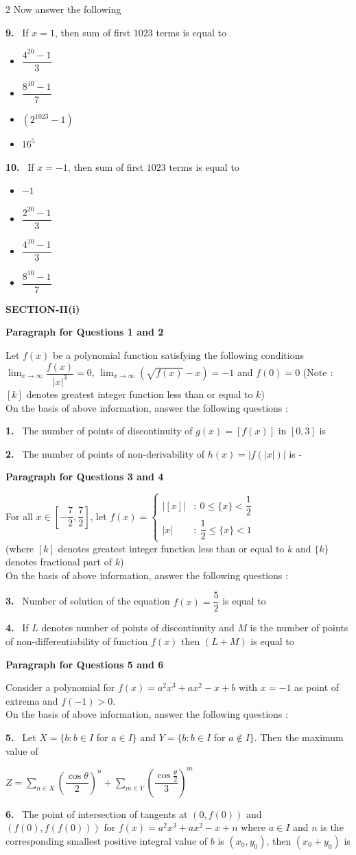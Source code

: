 \documentclass[10pt]{extarticle}
\newcommand{\sect}[1]{\par\smallskip\noindent\textbf{#1}\par}
\newcommand{\qn}[1]{\par\smallskip\noindent\textbf{#1.}~}
\newcommand{\paraq}[2]{\par\smallskip\noindent\textbf{Paragraph for Questions #1 and #2}\par}
\newenvironment{qoptions}{\begin{itemize}[leftmargin=1.8em,itemsep=1pt,topsep=2pt,label={}]}{\end{itemize}}
\newcommand{\opt}[2]{\item[(#1)] #2}
\begin{document}
\begin{multicols}{2}
Now answer the following
\qn{9} If $x=1$, then sum of first $1023$ terms is equal to
\begin{qoptions}
\opt{A}{$\dfrac{4^{20}-1}{3}$}
\opt{B}{$\dfrac{8^{10}-1}{7}$}
\opt{C}{$(2^{1023}-1)$}
\opt{D}{$16^5$}
\end{qoptions}
\qn{10} If $x=-1$, then sum of first $1023$ terms is equal to
\begin{qoptions}
\opt{A}{$-1$}
\opt{B}{$\dfrac{2^{20}-1}{3}$}
\opt{C}{$\dfrac{4^{10}-1}{3}$}
\opt{D}{$\dfrac{8^{10}-1}{7}$}
\end{qoptions}
\sect{SECTION-II(i)}
\paraq{1}{2}
Let $f(x)$ be a polynomial function satisfying the following conditions $\displaystyle\lim_{x\to\infty}\dfrac{f(x)}{|x|^3}=0$, $\displaystyle\lim_{x\to\infty}\left(\sqrt{f(x)}-x\right)=-1$ and $f(0)=0$ (Note : $[k]$ denotes greatest integer function less than or equal to $k$)\\
On the basis of above information, answer the following questions :
\qn{1} The number of points of discontinuity of $g(x)=[f(x)]$ in $[0,3]$ is
\qn{2} The number of points of non-derivability of $h(x)=|f(|x|)|$ is -
\paraq{3}{4}
For all $x\in\left[-\dfrac72,\dfrac72\right]$, let $f(x)=\begin{cases}\bigl|[x]\bigr| & ;\ 0\le\{x\}<\dfrac12\\ |x| & ;\ \dfrac12\le\{x\}<1\end{cases}$\\
(where $[k]$ denotes greatest integer function less than or equal to $k$ and $\{k\}$ denotes fractional part of $k$)\\
On the basis of above information, answer the following questions :
\qn{3} Number of solution of the equation $f(x)=\dfrac52$ is equal to
\qn{4} If $L$ denotes number of points of discontinuity and $M$ is the number of points of non-differentiability of function $f(x)$ then $(L+M)$ is equal to
\paraq{5}{6}
Consider a polynomial for $f(x)=a^2x^3+ax^2-x+b$ with $x=-1$ as point of extrema and $f(-1)>0$.\\
On the basis of above information, answer the following questions :
\qn{5} Let $X=\{b:b\in I$ for $a\in I\}$ and $Y=\{b:b\in I$ for $a\notin I\}$. Then the maximum value of\par\noindent\hfill{\small$Z=\displaystyle\sum_{n\in X}\left(\dfrac{\cos\theta}{2}\right)^n+\sum_{m\in Y}\left(\dfrac{\cos\frac\theta2}{3}\right)^m$}\hfill\null\par
\qn{6} The point of intersection of tangents at $(0,f(0))$ and $(f(0),f(f(0)))$ for $f(x)=a^2x^3+ax^2-x+n$ where $a\in I$ and $n$ is the corresponding smallest positive integral value of $b$ is $(x_0,y_0)$, then $(x_0+y_0)$ is

\end{multicols}
\end{document}
